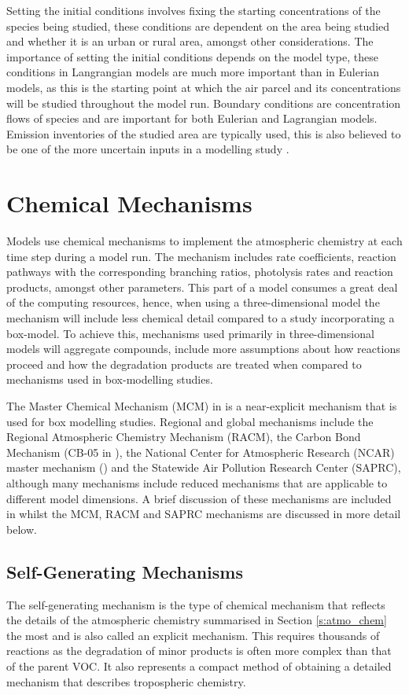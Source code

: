 Setting the initial conditions involves fixing the starting concentrations of the species being studied, these conditions are 
dependent on the area being studied and whether it is an urban or rural area, amongst other considerations. The importance of 
setting the initial conditions depends on the model type, these conditions in Langrangian models are much more important than 
in Eulerian models, as this is the starting point at which the air parcel and its concentrations will be studied throughout the
model run. Boundary conditions are concentration flows of species and are important for both Eulerian and Lagrangian models. 
Emission inventories of the studied area are typically used, this is also believed to be one of the more uncertain inputs in a 
modelling study \citep{Russell:2000}.

\section{Chemical Mechanisms}
Models use chemical mechanisms to implement the atmospheric chemistry at each time step during a model run. The mechanism 
includes rate coefficients, reaction pathways with the corresponding branching ratios, photolysis rates and reaction products, 
amongst other parameters. This part of a model consumes a great deal of the computing resources, hence, when using a 
three-dimensional model the mechanism will include less chemical detail compared to a study incorporating a box-model. To 
achieve this, mechanisms used primarily in three-dimensional models will aggregate compounds, include more assumptions about 
how reactions proceed and how the degradation products are treated when compared to mechanisms used in box-modelling studies.

The Master Chemical Mechanism (MCM) in \citep{Saunders:2003, Jenkin:2003} is a near-explicit mechanism that is used for box 
modelling studies. Regional and global mechanisms include the Regional Atmospheric Chemistry Mechanism (RACM), the Carbon Bond 
Mechanism (CB-05 in \citep{Yarwood:2005}), the National Center for Atmospheric Research (NCAR) master mechanism 
(\citep{Madronich:1989}) and the Statewide Air Pollution Research Center (SAPRC), although many mechanisms include reduced 
mechanisms that are applicable to different model dimensions. A brief discussion of these mechanisms are included in 
\citep{Russell:2000} whilst the MCM, RACM and SAPRC mechanisms are discussed in more detail below.

\subsection{Self-Generating Mechanisms}
The self-generating mechanism is the type of chemical mechanism that reflects the details of the atmospheric chemistry 
summarised in Section \ref{s:atmo_chem} the most and is also called an explicit mechanism. This requires thousands of reactions
as the degradation of minor products is often more complex than that of the parent VOC. It also represents a compact method of 
obtaining a detailed mechanism that describes tropospheric chemistry.

